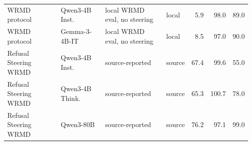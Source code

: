 \begin{table}[H]
{\begin{tabular}{llllrrr}
WRMD protocol & Qwen3-4B Inst. & local WRMD eval, no steering & local & 5.9 & 98.0 & 89.0 \\
WRMD protocol & Gemma-3-4B-IT & local WRMD eval, no steering & local & 8.5 & 97.0 & 90.0 \\
Refusal Steering WRMD & Qwen3-4B Inst. & source-reported & source & 67.4 & 99.6 & 55.0 \\
Refusal Steering WRMD & Qwen3-4B Think. & source-reported & source & 65.3 & 100.7 & 78.0 \\
Refusal Steering WRMD & Qwen3-80B & source-reported & source & 76.2 & 97.1 & 99.0 \\
\bottomrule
\end{tabular}}
\end{table}
